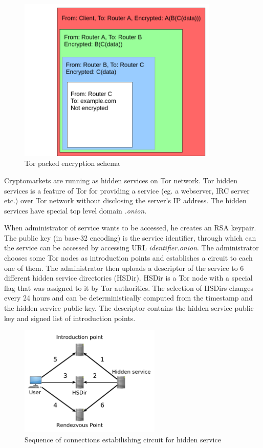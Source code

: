 \documentclass[
  digital, %
  table,   %
  lof,     %
  lot,     %
  oneside
]{fithesis3}
\begin{document}
\begin{figure}[!htb]
    \centering
    \includegraphics[width=0.85\textwidth]{tor-packet}
    \caption{Tor packed encryption schema}
    \label{tor-packet}
\end{figure}
 
Cryptomarkets are running as hidden services on Tor network.
Tor hidden services is a feature of Tor for providing a service (eg. a webserver, IRC server etc.) over Tor network
without disclosing the server's IP address. The hidden services have special top level domain \emph{.onion}.

When administrator of service wants to be accessed, he creates an RSA keypair.
The public key (in base-32 encoding) is the service identifier,
through which can the service can be accessed by accessing URL \emph{identifier.onion}.
The administrator chooses some Tor nodes as introduction points and establishes a circuit to each one of them.
The administrator then uploads a descriptor of the service to 6 different hidden service directories (HSDir).
HSDir is a Tor node with a special flag that was assigned to it by Tor authorities.
The selection of HSDirs changes every 24 hours and can be deterministically computed from the timestamp and the hidden service public key.
The descriptor contains the hidden service public key and signed list of introduction points.

\begin{figure}[!htb]
    \centering
    \includegraphics[width=0.6\textwidth]{onion.pdf}
    \caption{Sequence of connections estabilishing circuit for hidden service}
    \label{onionservice}
\end{figure}
\end{document}

